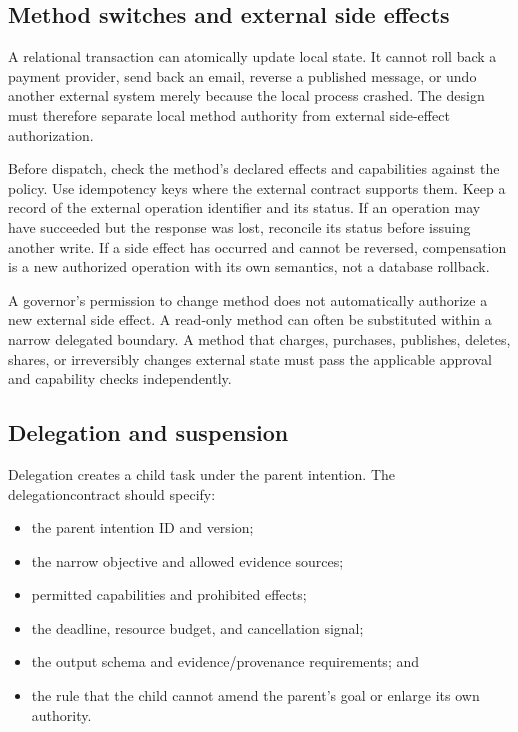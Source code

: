 \subsection{Method switches and external side effects}

A relational transaction can atomically update local state. It cannot roll back a payment provider, send back an email, reverse a published message, or undo another external system merely because the local process crashed. The design must therefore separate local method authority from external side-effect authorization.

Before dispatch, check the method's declared effects and capabilities against the policy. Use idempotency keys where the external contract supports them. Keep a record of the external operation identifier and its status. If an operation may have succeeded but the response was lost, reconcile its status before issuing another write. If a side effect has occurred and cannot be reversed, compensation is a new authorized operation with its own semantics, not a database rollback.

\begin{warningbox}
A governor's permission to change method does not automatically authorize a new external side effect. A read-only method can often be substituted within a narrow delegated boundary. A method that charges, purchases, publishes, deletes, shares, or irreversibly changes external state must pass the applicable approval and capability checks independently.
\end{warningbox}

\subsection{Delegation and suspension}

Delegation creates a child task under the parent intention. The \gls{delegationcontract} should specify:

\begin{itemize}
  \item the parent intention ID and version;
  \item the narrow objective and allowed evidence sources;
  \item permitted capabilities and prohibited effects;
  \item the deadline, resource budget, and cancellation signal;
  \item the output schema and evidence/provenance requirements; and
  \item the rule that the child cannot amend the parent's goal or enlarge its own authority.
\end{itemize}

